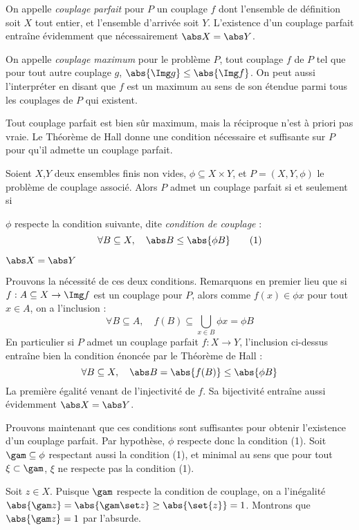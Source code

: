 On appelle \emph{couplage parfait} pour $P$ un couplage $f$ dont l'ensemble de définition soit $X$ tout entier, et l'ensemble d'arrivée soit $Y$. L'existence d'un couplage parfait entraîne évidemment que nécessairement $\abs X = \abs Y$.

On appelle \emph{couplage maximum} pour le problème $P$, tout couplage $f$ de $P$ tel que pour tout autre couplage $g$, $\abs{\Img g} \leq \abs{\Img f}$. On peut aussi l'interpréter en disant que $f$ est un maximum au sens de son étendue parmi tous les couplages de $P$ qui existent.
\SEP

Tout couplage parfait est bien sûr maximum, mais la réciproque n'est à priori pas vraie. Le Théorème de Hall donne une condition nécessaire et suffisante sur $P$ pour qu'il admette un couplage parfait.

\SEP{} Soient $X$,$Y$ deux ensembles finis non vides, $\phi \subseteq X \times Y$, et $P = (X,Y,\phi)$ le problème de couplage associé. Alors $P$ admet un couplage parfait si et seulement si 
\mathL
\item $\phi$ respecte la condition suivante, dite \emph{condition de couplage} :
\[ \forall B \subseteq X, \quad \abs B \leq \abs{ \phi B } \tag{1} \]
\item $\abs X = \abs Y$
\endL
\SEP\jpreuve

    Prouvons la nécessité de ces deux conditions. Remarquons en premier lieu que si $f : A \subseteq X \to \Img f $ est un couplage pour $P$, alors comme $f(x) \in \phi x$ pour tout $x \in A$, on a l'inclusion :
    \[ \forall B \subseteq A, \quad f(B) \subseteq  \bigcup_{x \in B} \phi x = \phi B \]
    En particulier si $P$ admet un couplage parfait $f : X \to Y$, l'inclusion ci-dessus entraîne bien la condition énoncée par le Théorème de Hall :
    \[ \forall B \subseteq X, \quad \abs B = \abs{f(B)} \leq \abs{ \phi B } \]
    La première égalité venant de l'injectivité de $f$. Sa bijectivité entraîne aussi évidemment $\abs X = \abs Y$.
    \medskip
    
    Prouvons maintenant que ces conditions sont suffisantes pour obtenir l'existence d'un couplage parfait. Par hypothèse, $\phi$ respecte donc la condition (1). Soit $\gam \subseteq \phi$ respectant aussi la condition (1), et minimal au sens que pour tout $\xi \subset \gam$, $\xi$ ne respecte pas la condition (1).
    
    Soit $z \in X$. Puisque $\gam$ respecte la condition de couplage, on a l'inégalité $\abs {\gam z} = \abs {\gam \set z} \geq \abs{\set{z}} = 1$.   Montrons que $\abs{\gam z} = 1$ par l'absurde.
    
